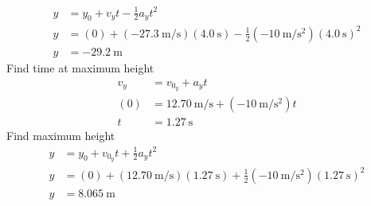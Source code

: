 \documentclass{article}
\begin{document}
\begin{align*}
	y & = y_0 + v_yt - \frac{1}{2}a_yt^2 \\
	y & = (0) + (\SI{-27.3}{\meter \per \second})(\SI{4.0}{\second}) - \frac{1}{2}(\SI{-10}{\meter \per \second \squared})(\SI{4.0}{\second})^2 \\
	y & = \SI{-29.2}{\meter}
\end{align*}
Find time at maximum height
\begin{align*}
	v_y & = v_{0_y} + a_yt \\
	(0) & = \SI{12.70}{\meter \per \second} + (\SI{-10}{\meter \per \second \squared})t \\
	t & = \SI{1.27}{\second}
\end{align*}
Find maximum height
\begin{align*}
	y & = y_0 + v_{0_y}t + \frac{1}{2}a_yt^2 \\
	y & = (0) + (\SI{12.70}{\meter \per \second})(\SI{1.27}{\second}) + \frac{1}{2}(\SI{-10}{\meter \per \second \squared})(\SI{1.27}{\second})^2 \\
	y & = \SI{8.065}{\meter}
\end{align*}
\end{document}
